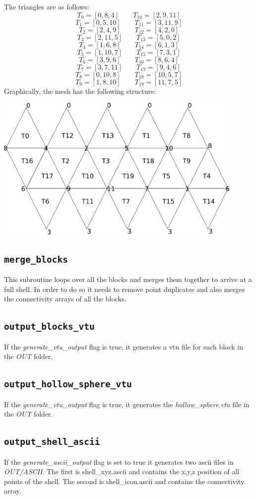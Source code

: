  The triangles are as follows:
 \[  T_0=[0,8,4]  \quad\quad T_{10}=[2,9,11]   \]
 \[  T_1=[0,5,10] \quad\quad T_{11}=[3,11,9]   \]
 \[  T_2=[2,4,9]  \quad\quad T_{12}=[4,2,0]   \]
 \[  T_3=[2,11,5] \quad\quad T_{13}=[5,0,2]   \]
 \[  T_4=[1,6,8]  \quad\quad T_{14}=[6,1,3]   \]
 \[  T_5=[1,10,7] \quad\quad T_{15}=[7,3,1]   \]
 \[  T_6=[3,9,6]  \quad\quad T_{16}=[8,6,4]   \]
 \[  T_7=[3,7,11] \quad\quad T_{17}=[9,4,6]   \]
 \[  T_8=[0,10,8] \quad\quad T_{18}=[10,5,7]   \]
 \[  T_9=[1,8,10] \quad\quad T_{19}=[11,7,5]   \]
 Graphically, the mesh has the following structure:
 \begin{center}
 \includegraphics[width=12cm]{images/flat_icosahedron}
 \end{center}
 \subsection{\tt merge\_blocks}
 This subroutine loops over all the blocks and merges them together to 
 arrive at a full shell. In order to do so it needs to remove point duplicates 
 and also merges the connectivity arrays of all the blocks.
 \subsection{\tt output\_blocks\_vtu}
 If the {\sl generate\_vtu\_output} flag is true, 
 it generates a vtu file for each block in the {\sl OUT} folder.
 \subsection{\tt output\_hollow\_sphere\_vtu}
 If the {\sl generate\_vtu\_output} flag is true, 
 it generates the {\sl hollow\_sphere.vtu} file in the {\sl OUT} folder. 
 \subsection{\tt output\_shell\_ascii}
 If the {\sl generate\_ascii\_output} flag is set to true
 it generates two ascii files in {\sl OUT/ASCII}. 
 The first is shell\_xyz.ascii and contains the x,y,z position of all points of the shell.
 The second is shell\_icon.ascii and contains the connectivity array.
